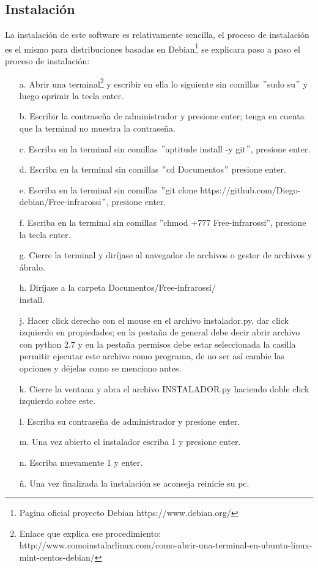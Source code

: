 \documentclass[12]{article}
\begin{document}
\begin{multicols}{2}
\subsection{Instalación}
La instalación de este software es relativamente sencilla, el proceso de instalación es el mismo para distribuciones basadas en Debian\footnote{Pagina oficial proyecto Debian https://www.debian.org/} se  explicara paso a paso el proceso de instalación:
\begin{enumerate}
\item[a.] Abrir una terminal\footnote{Enlace que explica ese procedimiento: http://www.comoinstalarlinux.com/como-abrir-una-terminal-en-ubuntu-linux-mint-centos-debian/} y escribir en ella lo siguiente sin comillas $"$sudo su$"$ y luego oprimir la tecla enter.
\item[b.] Escribir la contraseña de administrador y presione enter; tenga en cuenta que la terminal no muestra la contraseña.
\item[c.] Escriba en la terminal sin comillas $"$aptitude install -y git$"$, presione enter.
\item[d.] Escriba en la terminal sin comillas $"$cd Documentos$"$ presione enter.
\item[e.] Escriba en la terminal sin comillas $"$git clone https://github.com/Diego-debian/Free-infrarossi$"$, presione enter.
\item[f.] Escriba en la terminal sin comillas $”$chmod +777 Free-infrarossi$”$, presione la tecla enter.
\item[g.] Cierre la terminal y diríjase al navegador de archivos o gestor de archivos y ábralo.
\item[h.] Diríjase a la carpeta Documentos/Free-infrarossi/\\install.
\item[j.] Hacer click derecho con el mouse en el archivo instalador.py,  dar click izquierdo en propiedades; en la pestaña de general debe decir abrir archivo con python 2.7 y en la pestaña permisos debe estar seleccionada la casilla permitir ejecutar este archivo como programa, de no ser así cambie las opciones y déjelas como se menciono antes.
\item[k.] Cierre la ventana y abra el archivo INSTALADOR.py haciendo doble click izquierdo sobre este.
\item[l.] Escriba su contraseña de administrador y presione enter.
\item[m.] Una vez abierto el instalador escriba  1 y presione enter.
\item[n.] Escriba nuevamente 1 y enter.
\item[ñ.] Una vez finalizada la instalación se aconseja reinicie su pc.
\end{enumerate}


\end{multicols}
\end{document}
